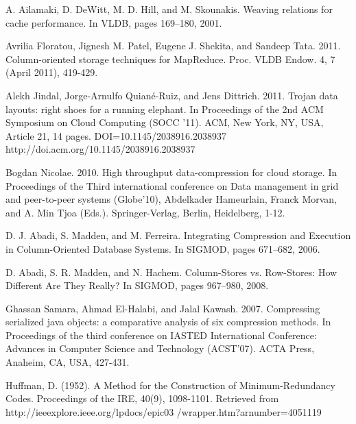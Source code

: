 \documentclass[twocolumn]{article}
\begin{document}
{\small
\begin{thebibliography}{10}

 A. Ailamaki, D. DeWitt, M. D. Hill, and M. Skounakis.
                Weaving relations for cache performance. In VLDB, pages
                169–180, 2001.

 Avrilia Floratou, Jignesh M. Patel, Eugene J. Shekita, and Sandeep
		Tata. 2011. Column-oriented storage techniques for MapReduce.
		Proc. VLDB Endow. 4, 7 (April 2011), 419-429.

 Alekh Jindal, Jorge-Arnulfo Quiané-Ruiz, and Jens Dittrich. 2011.
                Trojan data layouts: right shoes for a running elephant.
                In Proceedings of the 2nd ACM Symposium on Cloud Computing
                (SOCC '11). ACM, New York, NY, USA, Article 21, 14 pages.
                DOI=10.1145/2038916.2038937 http://doi.acm.org/10.1145/2038916.2038937

 Bogdan Nicolae. 2010. High throughput data-compression for cloud
                storage. In Proceedings of the Third international
                conference on Data management in grid and peer-to-peer
                systems (Globe'10), Abdelkader Hameurlain, Franck Morvan,
                and A. Min Tjoa (Eds.). Springer-Verlag, Berlin,
                Heidelberg, 1-12.

 D. J. Abadi, S. Madden, and M. Ferreira. Integrating
                Compression and Execution in Column-Oriented Database
                Systems. In SIGMOD, pages 671–682, 2006.

 D. Abadi, S. R. Madden, and N. Hachem. Column-Stores
                vs. Row-Stores: How Different Are They Really? In
                SIGMOD, pages 967–980, 2008.

 Ghassan Samara, Ahmad El-Halabi, and Jalal Kawash. 2007. Compressing
                serialized java objects: a comparative analysis of six
                compression methods. In Proceedings of the third conference
                on IASTED International Conference: Advances in Computer
                Science and Technology (ACST'07). ACTA Press, Anaheim, CA,
                USA, 427-431.

 Huffman, D. (1952). A Method for the Construction of Minimum-Redundancy Codes.
		Proceedings of the IRE, 40(9), 1098-1101. Retrieved from
		http://ieeexplore.ieee.org/lpdocs/epic03 /wrapper.htm?arnumber=4051119


\end{thebibliography}}
\end{document}
